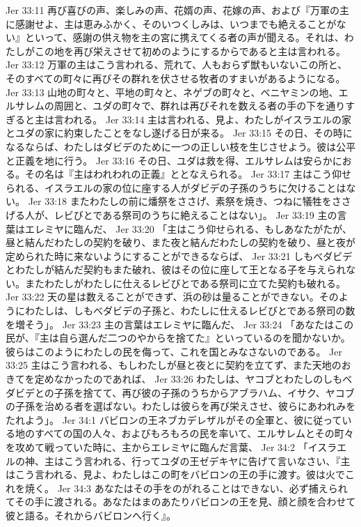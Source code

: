 Jer 33:11  再び喜びの声、楽しみの声、花婿の声、花嫁の声、および『万軍の主に感謝せよ、主は恵みふかく、そのいつくしみは、いつまでも絶えることがない』といって、感謝の供え物を主の宮に携えてくる者の声が聞える。それは、わたしがこの地を再び栄えさせて初めのようにするからであると主は言われる。
Jer 33:12  万軍の主はこう言われる、荒れて、人もおらず獣もいないこの所と、そのすべての町々に再びその群れを伏させる牧者のすまいがあるようになる。
Jer 33:13  山地の町々と、平地の町々と、ネゲブの町々と、ベニヤミンの地、エルサレムの周囲と、ユダの町々で、群れは再びそれを数える者の手の下を通りすぎると主は言われる。
Jer 33:14  主は言われる、見よ、わたしがイスラエルの家とユダの家に約束したことをなし遂げる日が来る。
Jer 33:15  その日、その時になるならば、わたしはダビデのために一つの正しい枝を生じさせよう。彼は公平と正義を地に行う。
Jer 33:16  その日、ユダは救を得、エルサレムは安らかにおる。その名は『主はわれわれの正義』ととなえられる。
Jer 33:17  主はこう仰せられる、イスラエルの家の位に座する人がダビデの子孫のうちに欠けることはない。
Jer 33:18  またわたしの前に燔祭をささげ、素祭を焼き、つねに犠牲をささげる人が、レビびとである祭司のうちに絶えることはない」。
Jer 33:19  主の言葉はエレミヤに臨んだ、
Jer 33:20  「主はこう仰せられる、もしあなたがたが、昼と結んだわたしの契約を破り、また夜と結んだわたしの契約を破り、昼と夜が定められた時に来ないようにすることができるならば、
Jer 33:21  しもべダビデとわたしが結んだ契約もまた破れ、彼はその位に座して王となる子を与えられない。またわたしがわたしに仕えるレビびとである祭司に立てた契約も破れる。
Jer 33:22  天の星は数えることができず、浜の砂は量ることができない。そのようにわたしは、しもべダビデの子孫と、わたしに仕えるレビびとである祭司の数を増そう」。
Jer 33:23  主の言葉はエレミヤに臨んだ、
Jer 33:24  「あなたはこの民が、『主は自ら選んだ二つのやからを捨てた』といっているのを聞かないか。彼らはこのようにわたしの民を侮って、これを国とみなさないのである。
Jer 33:25  主はこう言われる、もしわたしが昼と夜とに契約を立てず、また天地のおきてを定めなかったのであれば、
Jer 33:26  わたしは、ヤコブとわたしのしもべダビデとの子孫を捨てて、再び彼の子孫のうちからアブラハム、イサク、ヤコブの子孫を治める者を選ばない。わたしは彼らを再び栄えさせ、彼らにあわれみをたれよう」。
Jer 34:1  バビロンの王ネブカデレザルがその全軍と、彼に従っている地のすべての国の人々、およびもろもろの民を率いて、エルサレムとその町々を攻めて戦っていた時に、主からエレミヤに臨んだ言葉、
Jer 34:2  「イスラエルの神、主はこう言われる、行ってユダの王ゼデキヤに告げて言いなさい、『主はこう言われる、見よ、わたしはこの町をバビロンの王の手に渡す。彼は火でこれを焼く。
Jer 34:3  あなたはその手をのがれることはできない、必ず捕えられてその手に渡される。あなたはまのあたりバビロンの王を見、顔と顔を合わせて彼と語る。それからバビロンへ行く』。
